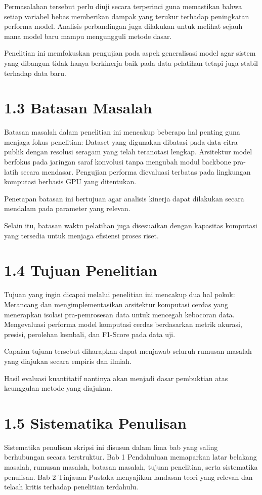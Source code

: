 \documentclass[12pt,a4paper,oneside]{report}
\begin{document}
Permasalahan tersebut perlu diuji secara terperinci guna memastikan bahwa setiap variabel bebas memberikan dampak yang terukur terhadap peningkatan performa model. Analisis perbandingan juga dilakukan untuk melihat sejauh mana model baru mampu mengungguli metode dasar.

Penelitian ini memfokuskan pengujian pada aspek generalisasi model agar sistem yang dibangun tidak hanya berkinerja baik pada data pelatihan tetapi juga stabil terhadap data baru.

\section{1.3 Batasan Masalah}
Batasan masalah dalam penelitian ini mencakup beberapa hal penting guna menjaga fokus penelitian:
Dataset yang digunakan dibatasi pada data citra publik dengan resolusi seragam yang telah teranotasi lengkap.
Arsitektur model berfokus pada jaringan saraf konvolusi tanpa mengubah modul backbone pra-latih secara mendasar.
Pengujian performa dievaluasi terbatas pada lingkungan komputasi berbasis GPU yang ditentukan.

Penetapan batasan ini bertujuan agar analisis kinerja dapat dilakukan secara mendalam pada parameter yang relevan.

Selain itu, batasan waktu pelatihan juga disesuaikan dengan kapasitas komputasi yang tersedia untuk menjaga efisiensi proses riset.

\section{1.4 Tujuan Penelitian}
Tujuan yang ingin dicapai melalui penelitian ini mencakup dua hal pokok:
Merancang dan mengimplementasikan arsitektur komputasi cerdas yang menerapkan isolasi pra-pemrosesan data untuk mencegah kebocoran data.
Mengevaluasi performa model komputasi cerdas berdasarkan metrik akurasi, presisi, perolehan kembali, dan F1-Score pada data uji.

Capaian tujuan tersebut diharapkan dapat menjawab seluruh rumusan masalah yang diajukan secara empiris dan ilmiah.

Hasil evaluasi kuantitatif nantinya akan menjadi dasar pembuktian atas keunggulan metode yang diajukan.

\section{1.5 Sistematika Penulisan}
Sistematika penulisan skripsi ini disusun dalam lima bab yang saling berhubungan secara terstruktur.
Bab 1 Pendahuluan memaparkan latar belakang masalah, rumusan masalah, batasan masalah, tujuan penelitian, serta sistematika penulisan.
Bab 2 Tinjauan Pustaka menyajikan landasan teori yang relevan dan telaah kritis terhadap penelitian terdahulu.
\end{document}
